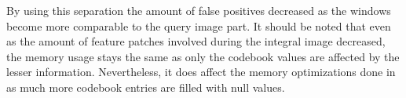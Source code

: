 By using this separation the amount of false positives decreased as the windows become more comparable to the query image part. It should be noted that even as the amount of feature patches involved during the integral image decreased, the memory usage stays the same as only the codebook values are affected by the lesser information. Nevertheless, it does affect the memory optimizations done in  as much more codebook entries are filled with null values.
